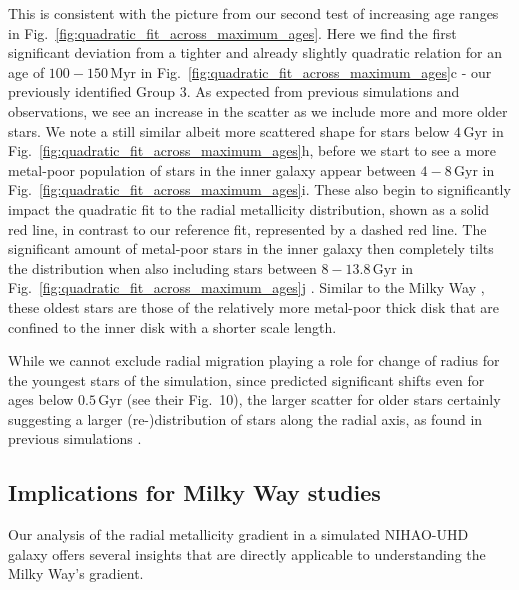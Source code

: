 \documentclass[fleqn,usenatbib]{mnras}
\begin{document}
This is consistent with the picture from our second test of increasing age ranges in Fig.~\ref{fig:quadratic_fit_across_maximum_ages}. Here we find the first significant deviation from a tighter and already slightly quadratic relation for an age of $100-150\,\mathrm{Myr}$ in Fig.~\ref{fig:quadratic_fit_across_maximum_ages}c - our previously identified Group 3. As expected from previous simulations and observations, we see an increase in the scatter as we include more and more older stars. We note a still similar albeit more scattered shape for stars below $4\,\mathrm{Gyr}$ in  Fig.~\ref{fig:quadratic_fit_across_maximum_ages}h, before we start to see a more metal-poor population of stars in the inner galaxy appear between $4-8\,\mathrm{Gyr}$ in  Fig.~\ref{fig:quadratic_fit_across_maximum_ages}i. These also begin to significantly impact the quadratic fit to the radial metallicity distribution, shown as a solid red line, in contrast to our reference fit, represented by a dashed red line. The significant amount of metal-poor stars in the inner galaxy then completely tilts the distribution when also including stars between $8-13.8\,\mathrm{Gyr}$ in Fig.~\ref{fig:quadratic_fit_across_maximum_ages}j \citep[see also][]{Johnson2024}. Similar to the Milky Way \citep{BlandHawthorn_Gerhard2016}, these oldest stars are those of the relatively more metal-poor thick disk that are confined to the inner disk with a shorter scale length.

While we cannot exclude radial migration playing a role for change of radius for the youngest stars of the simulation, since \citet{Frankel2018} predicted significant shifts even for ages below $0.5\,\mathrm{Gyr}$ (see their Fig.~10), the larger scatter for older stars certainly suggesting a larger (re-)distribution of stars along the radial axis, as found in previous simulations \citep{Minchev2010, Grand2015}.

\subsection{Implications for Milky Way studies} \label{sec:implications_milky_way}

Our analysis of the radial metallicity gradient in a simulated NIHAO-UHD galaxy offers several insights that are directly applicable to understanding the Milky Way's gradient.
\end{document}

